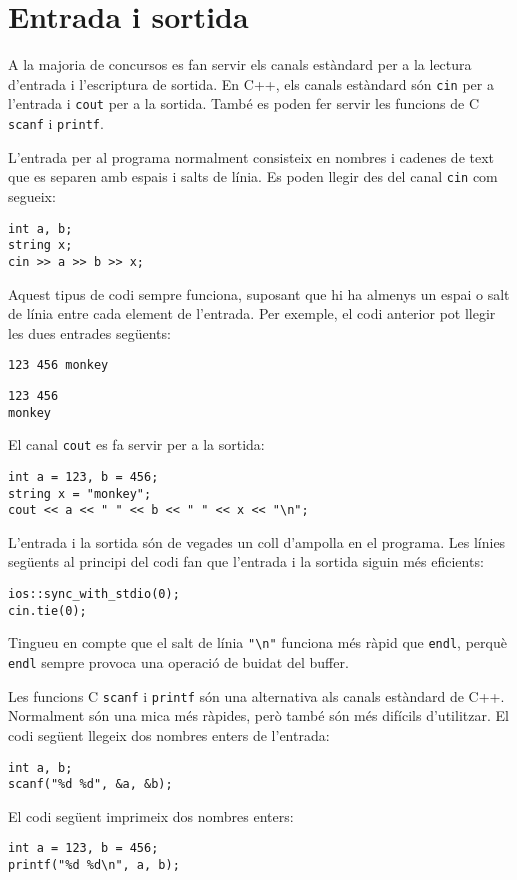 \section{Entrada i sortida}


A la majoria de concursos es fan servir els canals estàndard
per a la lectura d'entrada i l'escriptura de sortida.
En C++, els canals estàndard són
\texttt{cin} per a l'entrada i \texttt{cout} per a la sortida.
Tamb\'e es poden fer servir les funcions de C
\texttt{scanf} i \texttt{printf}.

L'entrada per al programa normalment consisteix en
nombres i cadenes de text que es separen amb
espais i salts de l\'inia.
Es poden llegir des del canal \texttt{cin}
com segueix:

\begin{lstlisting}
int a, b;
string x;
cin >> a >> b >> x;
\end{lstlisting}

Aquest tipus de codi sempre funciona,
suposant que hi ha almenys un espai
o salt de línia entre cada element de l'entrada.
Per exemple, el codi anterior pot llegir les dues entrades
següents:
\begin{lstlisting}
123 456 monkey
\end{lstlisting}
\begin{lstlisting}
123 456
monkey
\end{lstlisting}
El canal \texttt{cout} es fa servir per a la sortida:
\begin{lstlisting}
int a = 123, b = 456;
string x = "monkey";
cout << a << " " << b << " " << x << "\n";
\end{lstlisting}

L'entrada i la sortida són de vegades
un coll d'ampolla en el programa.
Les línies següents al principi del codi
fan que l'entrada i la sortida siguin
més eficients:

\begin{lstlisting}
ios::sync_with_stdio(0);
cin.tie(0);
\end{lstlisting}

Tingueu en compte que el salt de línia \texttt{"\textbackslash n"}
funciona més ràpid que \texttt{endl},
perquè \texttt{endl} sempre provoca
una operació de buidat del buffer.

Les funcions C \texttt{scanf}
i \texttt{printf} són una alternativa
als canals estàndard de C++.
Normalment són una mica més ràpides,
però també són més difícils d'utilitzar.
El codi següent llegeix dos nombres enters de l'entrada:
\begin{lstlisting}
int a, b;
scanf("%d %d", &a, &b);
\end{lstlisting}
El codi següent imprimeix dos nombres enters:
\begin{lstlisting}
int a = 123, b = 456;
printf("%d %d\n", a, b);
\end{lstlisting}

